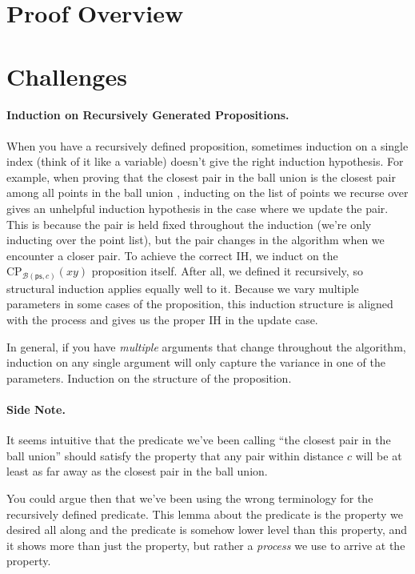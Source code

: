 \documentclass{article}
\begin{document}
\section{Proof Overview}

\section{Challenges}
\paragraph{Induction on Recursively Generated Propositions.}
When you have a recursively defined proposition, sometimes induction on a single index (think of it like a variable) doesn't give the right induction hypothesis.
For example, when proving that the closest pair in the ball union is the closest pair among all points in the ball union , inducting on the list of points we recurse over gives an unhelpful induction hypothesis in the case where we update the pair.
This is because the pair is held fixed throughout the induction (we're only inducting over the point list), but the pair changes in the algorithm when we encounter a closer pair.
To achieve the correct IH, we induct on the $\text{CP}_{\mathcal{B}(\mathsf{ps}, c)}(xy)$ proposition itself.
After all, we defined it recursively, so structural induction applies equally well to it.
Because we vary multiple parameters in some cases of the proposition, this induction structure is aligned with the process and gives us the proper IH in the update case.

In general, if you have \textit{multiple} arguments that change throughout the algorithm, induction on any single argument will only capture the variance in one of the parameters.
Induction on the structure of the proposition.

\paragraph{Side Note.} It seems intuitive that the predicate we've been calling ``the closest pair in the ball union'' should satisfy the property that any pair within distance $c$ will be at least as far away as the closest pair in the ball union.

You could argue then that we've been using the wrong terminology for the recursively defined predicate.
This lemma about the predicate is the property we desired all along and the predicate is somehow lower level than this property, and it shows more than just the property, but rather a \textit{process} we use to arrive at the property.
\end{document}

